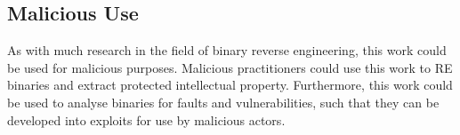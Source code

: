 \subsection{Malicious Use}
As with much research in the field of binary reverse engineering, this work could be used for malicious purposes. Malicious practitioners could use this work to RE binaries and extract protected intellectual property. Furthermore, this work could be used to analyse binaries for faults and vulnerabilities, such that they can be developed into exploits for use by malicious actors.

